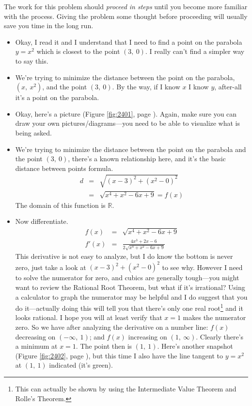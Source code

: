 \documentclass[12pt,addpoints, answers, fleqn]{exam}
\begin{document}
\begin{solution}
The work for this problem should \emph{proceed in steps} until you become more familiar with the process. Giving the problem some thought before proceeding will usually save you time in the long run.
\begin{itemize}
\item Okay, I read it and I understand that I need to find a point on the parabola $y=x^2$ which is closest to the point $\left( 3, \ 0 \right)$. I really can't find a simpler way to say this.
\item We're trying to minimize the distance between the point on the parabola, $\left( x, \ x^2 \right)$, and the point $\left( 3, \ 0 \right)$. By the way, if I know $x$ I know $y$, after-all it's a point on the parabola.
\item Okay, here's a picture (Figure \ref{fig:2401}, page \pageref{fig:2401}). Again, make sure you can draw your own pictures/diagrams---you need to be able to visualize what is being asked.
\item We're trying to minimize the distance between the point on the parabola and the point $\left( 3, \ 0 \right)$, there's a known relationship here, and it's the basic distance between points formula.
\begin{eqnarray*}
d &=& \sqrt{\left( x - 3\right)^2 + \left( x^2 - 0\right)^2}\\
 &=& \sqrt{x^4 + x^2 - 6x + 9} =f\left(x\right)
\end{eqnarray*}
The domain of this function is $\mathbb{R}$.
\item  Now differentiate.
\begin{eqnarray*}
f\left(x\right) &=& \sqrt{x^4 + x^2 - 6x + 9}\\
f'\left(x\right) &=& \frac{4x^3 + 2x - 6}{2\sqrt{x^4 + x^2 - 6x + 9} }
\end{eqnarray*}
This derivative is not easy to analyze, but I do know the bottom is never  zero, just take a look at $\left( x - 3\right)^2 + \left( x^2 - 0\right)^2$ to see why. However I need to solve the numerator for zero, and cubics are generally tough---you might want to review the Rational Root Theorem, but what if it's irrational? Using a calculator to graph the numerator may be helpful and I do suggest that you do it---actually doing this will tell you that there's only one real root\footnote{This can actually be shown by using the Intermediate Value Theorem and Rolle's Theorem.} and it looks rational. I hope you will at least verify that $x=1$ makes the numerator zero. So we have after analyzing the derivative on a number line: $f\left( x \right)$ decreasing on $\left( -\infty, \ 1 \right)$; and $f\left( x \right)$ increasing on $\left( 1, \ \infty \right)$. Clearly there's a minimum at $x=1$. The point then is $\left( 1, \ 1 \right)$. Here's another snapshot (Figure \ref{fig:2402}, page \pageref{fig:2402}), but this time I also have the line tangent to $y=x^2$ at $\left( 1, \ 1 \right)$ indicated (it's green).
\end{itemize}
\end{solution}
\end{document}
